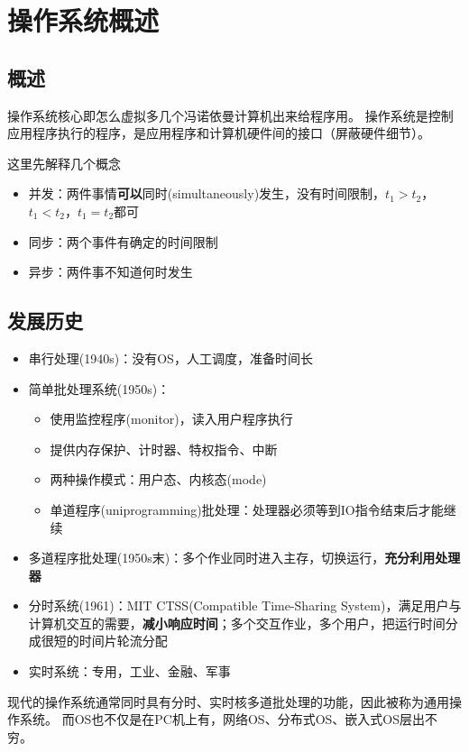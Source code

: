 
\section{操作系统概述}
\subsection{概述}
操作系统核心即怎么虚拟多几个冯诺依曼计算机出来给程序用。
操作系统是控制应用程序执行的程序，是应用程序和计算机硬件间的接口（屏蔽硬件细节）。

这里先解释几个概念
\begin{itemize}
	\item 并发：两件事情\textbf{可以}同时(simultaneously)发生，没有时间限制，$t_1>t_2$，$t_1<t_2$，$t_1=t_2$都可
	\item 同步：两个事件有确定的时间限制
	\item 异步：两件事不知道何时发生
\end{itemize}


\subsection{发展历史}
\begin{itemize}
	\item 串行处理(1940s)：没有OS，人工调度，准备时间长
	\item 简单批处理系统(1950s)：
	\begin{itemize}
		\item 使用监控程序(monitor)，读入用户程序执行
		\item 提供内存保护、计时器、特权指令、中断
		\item 两种操作模式：用户态、内核态(mode)
		\item 单道程序(uniprogramming)批处理：处理器必须等到IO指令结束后才能继续
	\end{itemize}
	\item 多道程序批处理(1950s末)：多个作业同时进入主存，切换运行，\textbf{充分利用处理器}
	\item 分时系统(1961)：MIT CTSS(Compatible Time-Sharing System)，满足用户与计算机交互的需要，\textbf{减小响应时间}；多个交互作业，多个用户，把运行时间分成很短的时间片轮流分配
	\item 实时系统：专用，工业、金融、军事
\end{itemize}

现代的操作系统通常同时具有分时、实时核多道批处理的功能，因此被称为通用操作系统。
而OS也不仅是在PC机上有，网络OS、分布式OS、嵌入式OS层出不穷。

